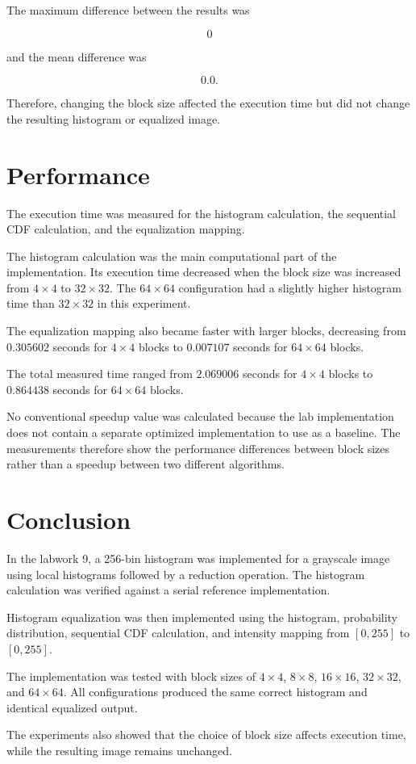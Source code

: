 \documentclass[11pt]{article}
\begin{document}
The maximum difference between the results was

\[
0
\]

and the mean difference was

\[
0.0.
\]

Therefore, changing the block size affected the execution time but did not
change the resulting histogram or equalized image.

\section{Performance}

The execution time was measured for the histogram calculation, the
sequential CDF calculation, and the equalization mapping.

The histogram calculation was the main computational part of the
implementation. Its execution time decreased when the block size was
increased from $4\times4$ to $32\times32$. The $64\times64$ configuration
had a slightly higher histogram time than $32\times32$ in this experiment.

The equalization mapping also became faster with larger blocks, decreasing
from $0.305602$ seconds for $4\times4$ blocks to $0.007107$ seconds for
$64\times64$ blocks.

The total measured time ranged from $2.069006$ seconds for $4\times4$
blocks to $0.864438$ seconds for $64\times64$ blocks.

No conventional speedup value was calculated because the lab implementation
does not contain a separate optimized implementation to use as a baseline.
The measurements therefore show the performance differences between block
sizes rather than a speedup between two different algorithms.

\section{Conclusion}

In the labwork 9, a 256-bin histogram was implemented for a grayscale image
using local histograms followed by a reduction operation. The histogram
calculation was verified against a serial reference implementation.

Histogram equalization was then implemented using the histogram,
probability distribution, sequential CDF calculation, and intensity
mapping from $[0,255]$ to $[0,255]$.

The implementation was tested with block sizes of $4\times4$, $8\times8$,
$16\times16$, $32\times32$, and $64\times64$. All configurations produced
the same correct histogram and identical equalized output.

The experiments also showed that the choice of block size affects
execution time, while the resulting image remains unchanged.
\end{document}

